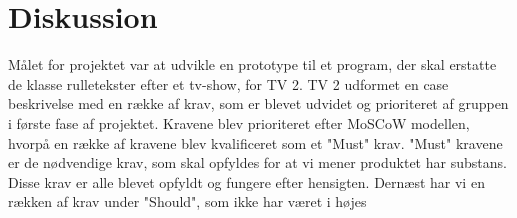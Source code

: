 \section{Diskussion}

Målet for projektet var at udvikle en prototype til et program, der skal erstatte de klasse rulletekster efter et tv-show, for TV 2. TV 2 udformet en case beskrivelse med en række af krav, som er blevet udvidet og prioriteret af gruppen i første fase af projektet. Kravene blev prioriteret efter MoSCoW modellen, hvorpå en række af kravene blev kvalificeret som et "Must" krav. "Must" kravene er de nødvendige krav, som skal opfyldes for at vi mener produktet har substans. Disse krav er alle blevet opfyldt og fungere efter hensigten. Dernæst har vi en rækken af krav under "Should", som ikke har været i højes

